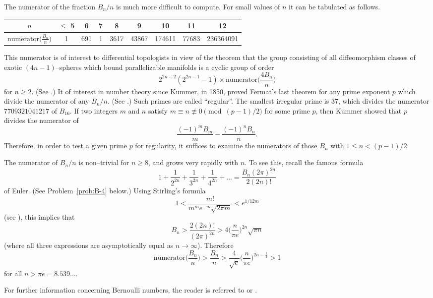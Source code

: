 \documentclass[../main]{subfiles}
\begin{document}
The numerator of the fraction $B_n/n$ is much more difficult to compute. For small values of $n$ it can be tabulated as follows. 


\begin{tabular}{|c| c |c |c| c| c| c| c| c|}
    \hline
    $n$ & $\le$ 5 & 6 & 7 & 8 & 9 & 10 & 11 & 12 \\
    \hline
    $\mathrm{numerator} \big(\frac {B_n} n\big)$ & 1 & 691 & 1 & 3617 & 43867 & 174611 & 77683 & 236364091 \\
    \hline 
\end{tabular}

\begin{remark*}
This numerator is of interest to differential topologists in view of the theorem that the group consisting of all diffeomorphism classes of exotic $(4n - 1)$--spheres which bound parallelizable manifolds is a cyclic group of order \[2^{2n - 2}(2^{2n - 1} - 1) \times \mathrm{numerator} \bigg( \dfrac{4B_n}{n}\bigg)\] for $n \ge 2$. (See \cite{kervaire-milnor}.) It of interest in number theory since Kummer, in 1850, proved Fermat's last theorem for any prime exponent $p$ which  divide the numerator of any $B_n/n$. (See \cite{borevich1966}.) Such primes are called ``regular''. The smallest irregular prime is $37$, which divides the numerator $7709321041217$ of $B_{16}$. If two integers $m$ and $n$ satisfy $m \equiv n \not\equiv 0 \pmod {(p - 1)/2}$ for some prime $p$, then Kummer showed that $p$ divides the numerator of \[\dfrac{(-1)^m B_m}{m} - \dfrac{(-1)^n B_n}{n}.\] Therefore, in order to test a given prime $p$ for regularity, it suffices to examine the numerators of those $B_n$ with $1 \le n < (p - 1)/2$. 

The numerator of $B_n/n$ is non--trivial for $n \ge 8$, and grows very rapidly with $n$. To see this, recall the famous formula 
\[1 + \frac 1 {2^{2n}} + \frac 1 {3^{2n}} + \frac 1 {4^{2n}} + \ldots = \dfrac{B_n(2\pi)^{2n}}{2(2n)!}\] 
of Euler. (See Problem~\ref{prob:B-4} below.) Using Stirling's formula \[1 < \frac {m!} {m^m e^{-m} \sqrt {2 \pi m}} < e^{1/12m}\] 
(see \cite{artin2015gamma}), this implies that
\[B_n > \dfrac{2(2n)!}{(2\pi)^{2n}} > 4 \bigg(\frac n {\pi e}\bigg)^{2n} \sqrt {\pi n}\] (where all three expressions are asymptotically equal as $n \to \infty$). Therefore 
\[\mathrm{numerator} \bigg(\frac {B_n} n\bigg) > \frac {B_n} n > \frac 4 {\sqrt e} \bigg(\frac n {\pi e}\bigg)^{2n - \frac 1 2} > 1\] for all $n > \pi e = 8.539 \ldots$.

For further information concerning Bernoulli numbers, the reader is referred to \cite{nielson} or \cite{borevich1966}.
\end{remark*} 
\end{document}
